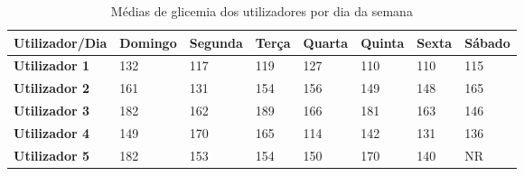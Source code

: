 


\begin{table}[H]
\centering
\begin{adjustbox}{max width=\textwidth}


\begin{tabular}{|l|l|l|l|l|l|l|l|}
\hline
\rowcolor[HTML]{C0C0C0} 
{\color[HTML]{000000} \textbf{Utilizador/Dia}} & {\color[HTML]{000000} \textbf{Domingo}} & {\color[HTML]{000000} \textbf{Segunda}} & {\color[HTML]{000000} \textbf{Terça}} & {\color[HTML]{000000} \textbf{Quarta}} & {\color[HTML]{000000} \textbf{Quinta}} & {\color[HTML]{000000} \textbf{Sexta}} & {\color[HTML]{000000} \textbf{Sábado}} \\ \hline
\rowcolor[HTML]{FFFFFF} 
\cellcolor[HTML]{C0C0C0}\textbf{Utilizador 1}  & 132                                     & 117                                     & 119                                   & 127                                    & 110                                    & 110                                   & 115                                    \\ \hline
\rowcolor[HTML]{FFFFFF} 
\cellcolor[HTML]{C0C0C0}\textbf{Utilizador 2}  & 161                                     & 131                                     & 154                                   & 156                                    & 149                                    & 148                                   & 165                                    \\ \hline
\rowcolor[HTML]{FFFFFF} 
\cellcolor[HTML]{C0C0C0}\textbf{Utilizador 3}  & 182                                     & 162                                     & 189                                   & 166                                    & 181                                    & 163                                   & 146                                    \\ \hline
\rowcolor[HTML]{FFFFFF} 
\cellcolor[HTML]{C0C0C0}\textbf{Utilizador 4}  & 149                                     & 170                                     & 165                                   & 114                                    & 142                                    & 131                                   & 136                                    \\ \hline
\rowcolor[HTML]{FFFFFF} 
\cellcolor[HTML]{C0C0C0}\textbf{Utilizador 5}  & 182                                     & 153                                     & 154                                   & 150                                    & 170                                    & 140                                   & NR                                     \\ \hline
\end{tabular}
\end{adjustbox}

\caption{Médias de glicemia dos utilizadores por dia da semana}
\label{tab:dias}
\end{table}
